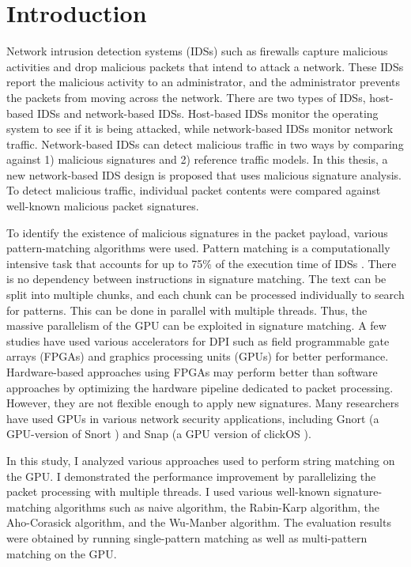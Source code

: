 \chapter{Introduction}
\parindent 0.25in

Network intrusion detection systems (IDSs) such as firewalls capture malicious activities and drop malicious packets that intend to attack a network. These IDSs report the malicious activity to an administrator, and the administrator prevents the packets from moving across the network. There are two types of IDSs, host-based IDSs and network-based IDSs. Host-based IDSs monitor the operating system to see if it is being attacked, while network-based IDSs monitor network traffic. Network-based IDSs can detect malicious traffic in two ways by comparing against 1) malicious signatures and 2) reference traffic models. In this thesis, a new network-based IDS design is proposed that uses malicious signature analysis. To detect malicious traffic, individual packet contents were compared against well-known malicious packet signatures. 

To identify the existence of malicious signatures in the packet payload, various pattern-matching algorithms were used. Pattern matching is a computationally intensive task that accounts for up to 75\% of the execution time of IDSs \cite{bib6}. There is no dependency between instructions in signature matching. The text can be split into multiple chunks, and each chunk can be processed individually to search for patterns. This can be done in parallel with multiple threads. Thus, the massive parallelism of the GPU can be exploited in signature matching. A few studies have used various accelerators for DPI such as field programmable gate arrays (FPGAs) \cite{bib13}\cite{bib24}\cite{bib27} and graphics processing units (GPUs) \cite{bib12}\cite{bib25} for better performance. Hardware-based approaches using FPGAs may perform better than software approaches by optimizing the hardware pipeline dedicated to packet processing. However, they are not flexible enough to apply new signatures. Many researchers have used GPUs in various network security applications, including Gnort \cite{bib10} (a GPU-version of Snort \cite{bib11}) and Snap \cite{bib9} (a GPU version of clickOS \cite{bib7}).

In this study, I analyzed various approaches used to perform string matching on the GPU. I demonstrated the performance improvement by parallelizing the packet processing with multiple threads. I used various well-known signature-matching algorithms such as naive algorithm, the Rabin-Karp algorithm, the Aho-Corasick algorithm, and the Wu-Manber algorithm. The evaluation results were obtained by running single-pattern matching as well as multi-pattern matching on the GPU.

